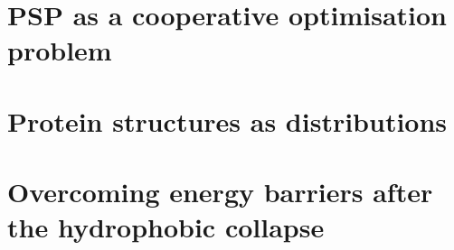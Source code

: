 \section{PSP as a cooperative optimisation problem}
\section{Protein structures as distributions}
\section{Overcoming energy barriers after the hydrophobic collapse}